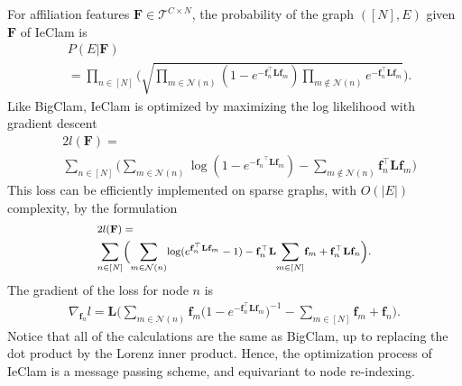 \documentclass{article}
\theoremstyle{plain}
\theoremstyle{definition}
\theoremstyle{remark}
\newcommand{\sumgraphm}{\underset{m \in [N]}{\sum}}
\def \sumgraphu {\underset{n\in [N]}{ \sum}}
\def \sumneighbors {\underset {m\in{\mathcal{N}(n)}}{\sum}}
\def \sumstrangers{\underset {m\notin{\mathcal{N}(n)}}{\sum}}
\newcommand{\flf}{\mathbf{f}_n^\top   \mathbf{L} \mathbf{f}_m}
\begin{document}
For affiliation features $\mathbf{F}\in \mathcal{T}^{C\times N}$, the probability of the graph $([N],E)$ given $\mathbf{F}$ of IeClam is
\begingroup
\footnotesize
\begin{equation}
\begin{aligned}
   &  P(E|\mathbf{F}) \\
   & = \prod_{n \in [N]}\Bigg(
        \sqrt{\prod_{m \in \mathcal{N}(n)}(1-e^{-\mathbf{f}_n^\top  \mathbf{L} \mathbf{f}_m})\prod_{m \notin \mathcal{N}(n)} e^{-\mathbf{f}_n^\top  \mathbf{L} \mathbf{f}_m}}\Bigg).
\end{aligned}
\label{eqn:IeClam_prob}
\end{equation}
\endgroup
Like BigClam, IeClam is optimized by maximizing the log likelihood with gradient descent
\begin{equation}
\begin{aligned}
   &  2 l(\mathbf{F}) =
    \\ &\sumgraphu \Big(\sumneighbors{}\log(1 - e^{-{\mathbf{f}_n}^\top  \mathbf{L} \mathbf{f}_m})  -   \sumstrangers{}  \mathbf{f}_n ^\top  \mathbf{L} \mathbf{f}_m\Big)
    \end{aligned}
\label{eqn:IeClam_loss}
\end{equation}
This loss can be efficiently implemented on sparse graphs, with $O(|E|)$ complexity, by the formulation
\begingroup
\begin{equation}
\footnotesize
\begin{aligned}
\label{eqn:loss_reparam_ie}
   &  2l(\mathbf{F})=\\
   & \sumgraphu \Big(\sumneighbors{\log(e^{\flf} - 1)}  - \mathbf{f}_n^\top  \mathbf{L}{\sumgraphm{\mathbf{f}_m}} + \mathbf{f}_n^\top  \mathbf{L}\mathbf{f}_n\Big).
\end{aligned}
\end{equation}
\endgroup
The gradient of the loss for node $n$ is
\begin{align}
\label{eqn:BCupdate_ie}
    \nabla_{\mathbf{f}_n}l = 
   \mathbf{L}\bigg( \sumneighbors{\mathbf{f}_m \big(1-e^{-\flf}
    \big)^{-1}} - \sumgraphm{\mathbf{f}_m} + \mathbf{f}_n \bigg).
\end{align}
Notice that all of the calculations are the same as BigClam, up to replacing the dot product by the Lorenz inner product. Hence, the optimization process  of IeClam is a message passing scheme, and equivariant to node re-indexing.
\end{document}
